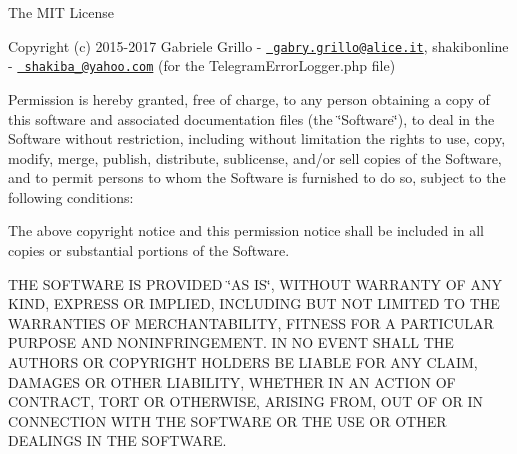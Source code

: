 The MIT License

Copyright (c) 2015-\/2017 Gabriele Grillo -\/ \href{mailto:gabry.grillo@alice.it}{\texttt{ gabry.\+grillo@alice.\+it}}, shakibonline -\/ \href{mailto:shakiba_9@yahoo.com}{\texttt{ shakiba\+\_@yahoo.\+com}} (for the Telegram\+Error\+Logger.\+php file)

Permission is hereby granted, free of charge, to any person obtaining a copy of this software and associated documentation files (the \char`\"{}\+Software\char`\"{}), to deal in the Software without restriction, including without limitation the rights to use, copy, modify, merge, publish, distribute, sublicense, and/or sell copies of the Software, and to permit persons to whom the Software is furnished to do so, subject to the following conditions\+:

The above copyright notice and this permission notice shall be included in all copies or substantial portions of the Software.

THE SOFTWARE IS PROVIDED \char`\"{}\+AS IS\char`\"{}, WITHOUT WARRANTY OF ANY KIND, EXPRESS OR IMPLIED, INCLUDING BUT NOT LIMITED TO THE WARRANTIES OF MERCHANTABILITY, FITNESS FOR A PARTICULAR PURPOSE AND NONINFRINGEMENT. IN NO EVENT SHALL THE AUTHORS OR COPYRIGHT HOLDERS BE LIABLE FOR ANY CLAIM, DAMAGES OR OTHER LIABILITY, WHETHER IN AN ACTION OF CONTRACT, TORT OR OTHERWISE, ARISING FROM, OUT OF OR IN CONNECTION WITH THE SOFTWARE OR THE USE OR OTHER DEALINGS IN THE SOFTWARE. 